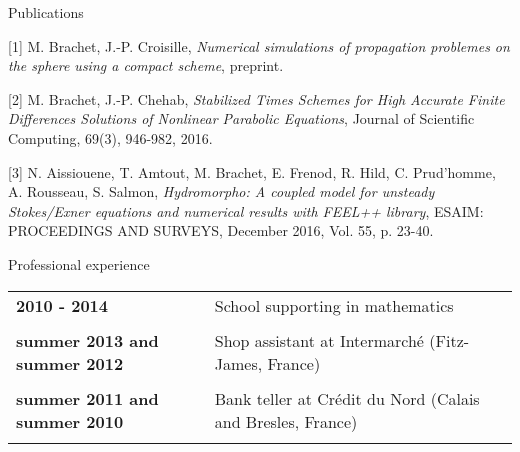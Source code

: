 \documentclass[10pt,a4paper]{report}
\begin{document}
\newpage
\noindent
{\selectfont
\begin{Large}
Publications
\end{Large}
\hrulefill
}

\vspace{0.6cm}

[1] {\sc  M. Brachet, J.-P. Croisille}, {\sl Numerical simulations of propagation problemes on the sphere using a compact scheme}, preprint.

\vspace{0.6cm}

[2] {\sc M. Brachet, J.-P. Chehab}, {\sl Stabilized Times Schemes for High Accurate Finite Differences Solutions of Nonlinear Parabolic Equations}, Journal of Scientific Computing, 69(3), 946-982, 2016.

\vspace{0.6cm}

[3] {\sc  N. Aissiouene, T. Amtout, M. Brachet, E. Frenod, R. Hild, C. Prud'homme, A. Rousseau, S. Salmon}, {\sl  Hydromorpho: A coupled model for unsteady Stokes/Exner equations and numerical results with FEEL++ library}, ESAIM: PROCEEDINGS AND SURVEYS, December 2016, Vol. 55, p. 23-40.






\vspace{1cm}
\noindent
{\selectfont
\begin{Large}
Professional experience
\end{Large}
\hrulefill
}

\vspace{0.6cm}
\noindent
\begin{center}
\begin{tabular}{p{5cm} p{10cm}}
\textbf{2010 - 2014} & School supporting in mathematics\\

& \\

\textbf{summer 2013 and summer 2012} & Shop assistant at Intermarché (Fitz-James, France) \\

& \\

\textbf{summer 2011 and summer 2010} & Bank teller at Crédit du Nord (Calais and Bresles, France) \\

& \\

\end{tabular}
\end{center}
\end{document}

